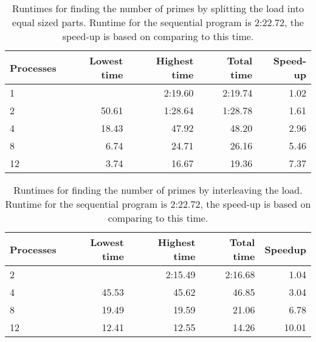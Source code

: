 \documentclass[a4paper]{article}
\begin{document}
\begin{table}[h]
	\centering
	\caption{Runtimes for finding the number of primes by splitting the load into equal sized parts. Runtime for the sequential program is 2:22.72, the speed-up is based on comparing to this time.}
	\label{tbl:prime}
	\begin{tabular}{l|r|r|r|r}
		Processes & Lowest time & Highest time & Total time & Speed-up \\ \hline
		 1 &  & 2:19.60 & 2:19.74 & 1.02 \\
		 2 & 50.61 & 1:28.64 & 1:28.78 & 1.61 \\
		 4 & 18.43 & 47.92 & 48.20 & 2.96 \\
		 8 &  6.74 & 24.71 & 26.16 & 5.46 \\
		12 &  3.74 & 16.67 & 19.36 & 7.37 \\
	\end{tabular}
\end{table}

\begin{table}[h]
	\centering
	\caption{Runtimes for finding the number of primes by interleaving the load. Runtime for the sequential program is 2:22.72, the speed-up is based on comparing to this time.}
	\label{tbl:prime2}
	\begin{tabular}{l|r|r|r|r}
		Processes & Lowest time & Highest time & Total time & Speedup \\ \hline
		 2 &    & 2:15.49 & 2:16.68 & 1.04 \\
	 	 4 & 45.53 & 45.62 & 46.85 & 3.04 \\
	 	 8 & 19.49 & 19.59 & 21.06 & 6.78 \\
		12 & 12.41 & 12.55 & 14.26 & 10.01 \\
	\end{tabular}
\end{table}
\end{document}
